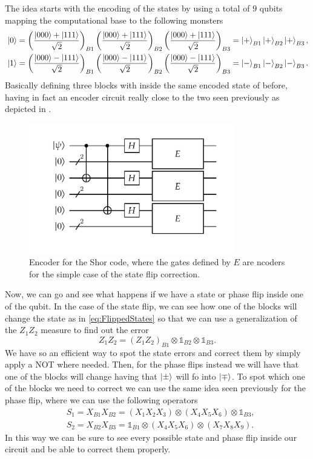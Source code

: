 The idea starts with the encoding of the states by using a total of $9$ qubits mapping the computational base to the following monsters
\begin{align}
    &\ket{0} = \left( \frac{\ket{000} + \ket{111}}{\sqrt{2}} \right)_{B1}\left( \frac{\ket{000} + \ket{111}}{\sqrt{2}} \right)_{B2}\left( \frac{\ket{000} + \ket{111}}{\sqrt{2}} \right)_{B3} = \ket{+}_{B1}\ket{+}_{B2}\ket{+}_{B3},\\
    &\ket{1} = \left( \frac{\ket{000} - \ket{111}}{\sqrt{2}} \right)_{B1}\left( \frac{\ket{000} - \ket{111}}{\sqrt{2}} \right)_{B2}\left( \frac{\ket{000} - \ket{111}}{\sqrt{2}} \right)_{B3} = \ket{-}_{B1}\ket{-}_{B2}\ket{-}_{B3}.
\end{align}
Basically defining three blocks with inside the same encoded state of before, having in fact an encoder circuit really close to the two seen previously as depicted in .
\begin{figure}[t]
    \centering
    \includegraphics[width=0.8\textwidth]{Immagini/ShorEncoder.pdf}
    \caption{
        Encoder for the Shor code, where the gates defined by $E$ are ncoders for the simple case of the state flip correction.
    }
    \label{fig:ShorEncoder}
\end{figure}
Now, we can go and see what happens if we have a state or phase flip inside one of the qubit. In the case of the state flip, we can see how one of the blocks will change the state as in \eqref{eq:FlippedStates} so that we can use a generalization of the $Z_1Z_2$ measure to find out the error
\begin{equation}
    Z_1Z_2 = (Z_1Z_2)_{B1}\otimes\mathbb{1}_{B2}\otimes\mathbb{1}_{B3}.
\end{equation}
We have so an efficient way to spot the state errors and correct them by simply apply a NOT where needed. Then, for the phase flips instead we will have that one of the blocks will change having that $\ket{\pm}$ will fo into $\ket{\mp}$. To spot which one of the blocks we need to correct we can use the same idea seen previously for the phase flip, where we can use the following operators
\begin{align}
    &S_1 = X_{B1}X_{B2} = (X_1X_2X_3)\otimes(X_4X_5X_6)\otimes\mathbb{1}_{B3},\\
    &S_2 = X_{B2}X_{B3} = \mathbb{1}_{B1} \otimes (X_4X_5X_6)\otimes (X_7X_8X_9).
\end{align}
In this way we can be sure to see every possible state and phase flip inside our circuit and be able to correct them properly.